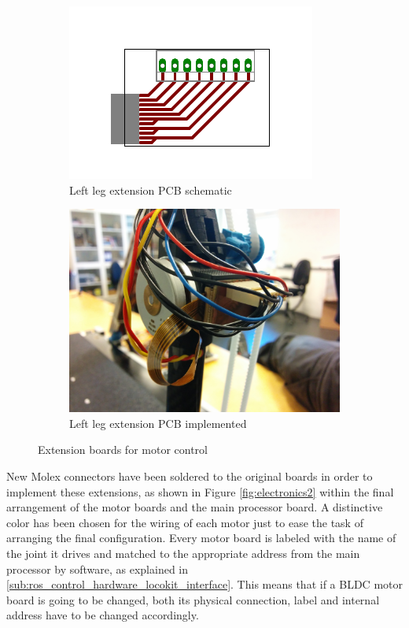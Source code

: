 \begin{figure}[h]
\label{fig:pcbs}
\centering
	\begin{subfigure}[b]{0.5\textwidth}
		\includegraphics[width=\textwidth]{figures/expansion_board.pdf}
		\caption{Left leg extension PCB schematic}
		\label{fig:pcb1}
	\end{subfigure}
	\begin{subfigure}[b]{0.4\textwidth}
		\includegraphics[width=\textwidth]{figures/photo_electronics_detail.jpg}
		\caption{Left leg extension PCB implemented}
		\label{fig:pcb2}
	\end{subfigure}
	\caption{Extension boards for motor control}
\end{figure}

New Molex connectors have been soldered to the original boards in order to implement these extensions, as shown in Figure \ref{fig:electronics2} within the final arrangement of the motor boards and the main processor board.
A distinctive color has been chosen for the wiring of each motor just to ease the task of arranging the final configuration.
Every motor board is labeled with the name of the joint it drives and matched to the appropriate address from the main processor by software, as explained in \ref{sub:ros_control_hardware_locokit_interface}.
This means that if a BLDC motor board is going to be changed, both its physical connection, label and internal address have to be changed accordingly.


